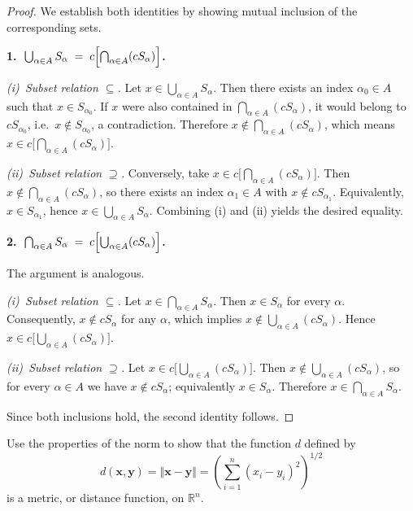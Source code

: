 \documentclass[10pt]{extarticle}
\begin{document}
\begin{proof}
    We establish both identities by showing mutual inclusion of the corresponding sets.

    \medskip
    \textbf{1.~$\displaystyle \bigcup_{\alpha\in A} S_{\alpha} \;=\; c\Bigl[\bigcap_{\alpha\in A} (c S_{\alpha})\Bigr]$.}

    \emph{(i)~Subset relation $\subseteq$.}  Let $x \in \bigcup_{\alpha\in A} S_{\alpha}$.  Then there exists an index $\alpha_0 \in A$ such that $x \in S_{\alpha_0}$.  If $x$ were also contained in $\bigcap_{\alpha\in A} (c S_{\alpha})$, it would belong to $c S_{\alpha_0}$, i.e.~$x \notin S_{\alpha_0}$, a contradiction.  Therefore $x \notin \bigcap_{\alpha\in A} (c S_{\alpha})$, which means $x \in c\bigl[\bigcap_{\alpha\in A} (c S_{\alpha})\bigr]$.

    \emph{(ii)~Subset relation $\supseteq$.}  Conversely, take $x \in c\bigl[\bigcap_{\alpha\in A} (c S_{\alpha})\bigr]$.  Then $x \notin \bigcap_{\alpha\in A} (c S_{\alpha})$, so there exists an index $\alpha_1 \in A$ with $x \notin c S_{\alpha_1}$.  Equivalently, $x \in S_{\alpha_1}$, hence $x \in \bigcup_{\alpha\in A} S_{\alpha}$.  Combining (i) and (ii) yields the desired equality.

    \medskip
    \textbf{2.~$\displaystyle \bigcap_{\alpha\in A} S_{\alpha} \;=\; c\Bigl[\bigcup_{\alpha\in A} (c S_{\alpha})\Bigr]$.}

    The argument is analogous.

    \emph{(i)~Subset relation $\subseteq$.}  Let $x \in \bigcap_{\alpha\in A} S_{\alpha}$.  Then $x \in S_{\alpha}$ for every $\alpha$.  Consequently, $x \notin c S_{\alpha}$ for any $\alpha$, which implies $x \notin \bigcup_{\alpha\in A} (c S_{\alpha})$.  Hence $x \in c\bigl[\bigcup_{\alpha\in A} (c S_{\alpha})\bigr]$.

    \emph{(ii)~Subset relation $\supseteq$.}  Let $x \in c\bigl[\bigcup_{\alpha\in A} (c S_{\alpha})\bigr]$.  Then $x \notin \bigcup_{\alpha\in A} (c S_{\alpha})$, so for every $\alpha \in A$ we have $x \notin c S_{\alpha}$; equivalently $x \in S_{\alpha}$.  Therefore $x \in \bigcap_{\alpha\in A} S_{\alpha}$.

    Since both inclusions hold, the second identity follows.
\end{proof}
\begin{exercise}[4.1]
    Use the properties of the norm to show that the function $d$ defined by
    $$
        d(\mathbf{x}, \mathbf{y}) = \Vert \mathbf{x} - \mathbf{y} \Vert = \left(\sum_{i=1}^{n}(x_i - y_i)^2\right)^{1/2}
    $$
    is a metric, or distance function, on $\mathbb{R}^n$.
\end{exercise}
\end{document}
